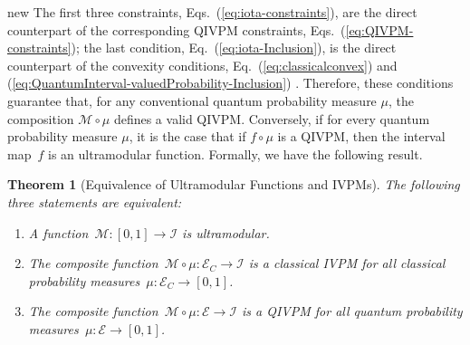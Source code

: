 \documentclass[english,reprint, aps, prl,superscriptaddress, showpacs,
showkeys, longbibliography, amsmath, amssymb, floatfix]{revtex4-1}
\theoremstyle{plain}
\newtheorem{thm}{Theorem}
\theoremstyle{definition}
\newcommand{\events}{\ensuremath{\mathcal{E}}}
\newcommand{\ultramodular}{\mathcal{M}}
\newcommand{\eventsC}{\ensuremath{\events_{C}}}
\newcommand{\says}[3]{\begin{framed}\begin{minipage}{0.9\linewidth}\color{#1}{#2 says: #3}\end{minipage}\end{framed}}
\newcommand{\andy}[1]{\says{blue}{Andy}{#1}}
\newenvironment{compare}{\begin{widetext}\end{widetext}}{\begin{widetext}\end{widetext}}
\newenvironment{newText}[1]{\begin{compareText}{#1}{new}}{\end{compareText}}
\begin{document}
\begin{compare}
\begin{newText}{\andy}
\noindent The first three constraints,
Eqs.~(\ref{eq:iota-constraints}), are the direct counterpart of the
corresponding QIVPM constraints, Eqs.~(\ref{eq:QIVPM-constraints});
the last condition, Eq.~(\ref{eq:iota-Inclusion}), is the direct
counterpart of the convexity conditions,
Eq.~(\ref{eq:classicalconvex}) and
(\ref{eq:QuantumInterval-valuedProbability-Inclusion})
\cite{Choquet1954,Shapley1971,NgMoYeh1997,MarinacciMontrucchio2005}. Therefore,
these conditions guarantee that, for any conventional quantum
probability measure $\mu$, the composition $\ultramodular \circ \mu$
defines a valid QIVPM. Conversely, if for every quantum probability
measure $\mu$, it is the case that if $f \circ \mu$ is a QIVPM, then the {\color{blue}interval
map}~$f$ is an ultramodular function. Formally, we have the following
result.
\end{newText}
\end{compare}

\begin{thm}[Equivalence of Ultramodular Functions and IVPMs]\label{thm:iota-statements}The
following three statements are equivalent:
\begin{enumerate}
\item \label{enu:iota-subject-to}A function~$\ultramodular:\left[0,1\right]\rightarrow\mathscr{I}$
is ultramodular.
\item \label{enu:iota-mu-CIVPM}The composite
  function~$\ultramodular\circ\mu:\eventsC\rightarrow\mathscr{I}$
  is a classical IVPM for all classical probability
  measures~$\mu:\eventsC\rightarrow\left[0,1\right]$.
\item \label{enu:iota-mu-QIVPM}The composite
  function~$\ultramodular\circ\mu:\events\rightarrow\mathscr{I}$ is a
  QIVPM for all quantum probability
  measures~$\mu:\events\rightarrow\left[0,1\right]$.
\end{enumerate}
\end{thm}
\end{document}
